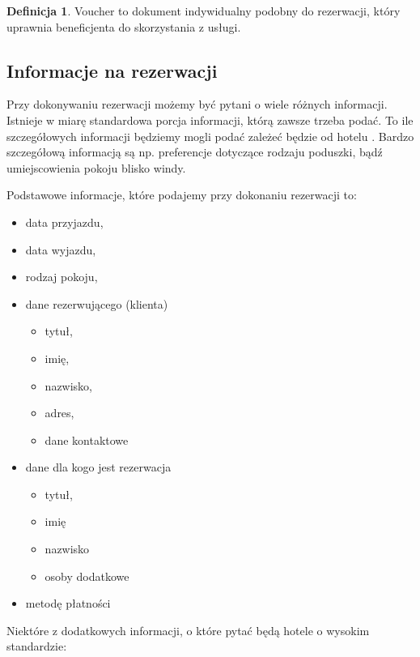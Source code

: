 \documentclass[a4paper,onecolumn,oneside,11pt,wide,floatssmall]{mwrep}
\theoremstyle{definition}
\newtheorem{defn}{Definicja}[section]
\theoremstyle{plain}%
\theoremstyle{remark}
\begin{document}
\begin{defn}{Voucher} 
to dokument indywidualny podobny do rezerwacji, który uprawnia beneficjenta 
do skorzystania z usługi.
\end{defn}

\subsection{Informacje na rezerwacji}
Przy dokonywaniu rezerwacji możemy być pytani o wiele różnych informacji. 
Istnieje w miarę standardowa porcja informacji, którą zawsze trzeba podać. 
To ile szczegółowych informacji będziemy mogli podać zależeć będzie od hotelu
. Bardzo szczegółową informacją są np. preferencje dotyczące rodzaju 
poduszki, bądź umiejscowienia pokoju blisko windy.

Podstawowe informacje, które podajemy przy dokonaniu rezerwacji to:

\begin{itemize}
  \item data przyjazdu,
  \item data wyjazdu,
  \item rodzaj pokoju,
  \item dane rezerwującego (klienta)
  \begin{itemize}
    \item tytuł,
    \item imię,
    \item nazwisko, 
    \item adres, 
    \item dane kontaktowe
  \end{itemize} 
  \item dane dla kogo jest rezerwacja
  \begin{itemize}
    \item tytuł,
    \item imię
    \item nazwisko
    \item osoby dodatkowe
  \end{itemize}
  \item metodę płatności
\end{itemize}

Niektóre z dodatkowych informacji, o które pytać będą hotele o wysokim 
standardzie:
\end{document}

